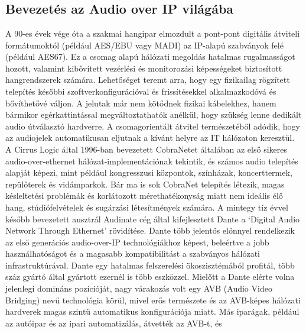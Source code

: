 \chapter{\AudioOverIp}
\section{Bevezetés az Audio over IP világába}
A 90-es évek vége óta a szakmai hangipar elmozdult a pont-pont digitális
átviteli formátumoktól (például AES/EBU vagy MADI) az IP-alapú szabványok felé
(például AES67). Ez a csomag alapú hálózati megoldás hatalmas rugalmasságot
hozott, valamint kibővített vezérlési és monitorozási képességeket biztosított
hangrendszerek számára. Lehetőséget teremt arra, hogy egy fizikailag rögzített
telepítés későbbi szoftverkonfigurációval és frissítésekkel alkalmazkodóvá és
bővíthetővé váljon. A jelutak már nem kötődnek fizikai kábelekhez, hanem
bármikor egérkattintással megváltoztathatók anélkül, hogy szükség lenne
dedikált audio útválasztó hardverre. A csomagorientált átvitel természetéből
adódik, hogy az audiojelek automatikusan eljutnak a kívánt helyre az IT
hálózaton keresztül. A Cirrus Logic által 1996-ban bevezetett CobraNetet
általában az első sikeres audio-over-ethernet hálózat-implementációnak tekintik,
és számos audio telepítés alapját képezi, mint például kongresszusi központok,
színházak, koncerttermek, repülőterek és vidámparkok. Bár ma is sok CobraNet
telepítés létezik, magas késleltetési problémák és korlátozott mérethatékonyság
miatt nem ideális élő hang, stúdiófelvételek és sugárzási létesítmények számára.
A mintegy tíz évvel később bevezetett ausztrál Audinate cég által kifejlesztett
Dante a `Digital Audio Network Through Ethernet' rövidítése. Dante több jelentős
előnnyel rendelkezik az első generációs audio-over-IP technológiákhoz képest,
beleértve a jobb használhatóságot és a magasabb kompatibilitást a szabványos
hálózati infrastruktúrával. Dante egy hatalmas felszerelési ökoszisztémából
profitál, több száz gyártó által gyártott ezernél is több eszközzel. Mielőtt a
Dante elérte volna jelenlegi domináns pozícióját, nagy várakozás volt egy AVB
(Audio Video Bridging) nevű technológia körül, mivel erős természete és az
AVB-képes hálózati hardverek magas szintű automatikus konfigurációja miatt. Más
iparágak, például az autóipar és az ipari automatizálás, átvették az AVB-t, és
